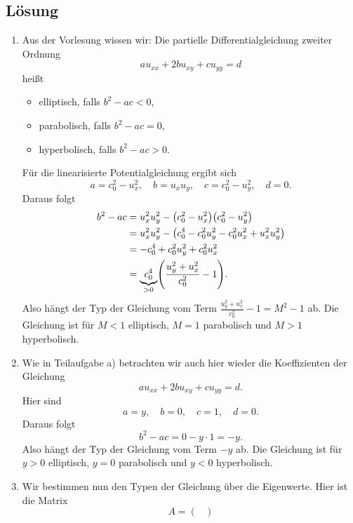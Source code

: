 \documentclass{exercise}
\begin{document}
    \subsection*{Lösung}
    \begin{enumerate}
        \item Aus der Vorlesung wissen wir: Die partielle Differentialgleichung zweiter Ordnung
        \[
            au_{xx} + 2bu_{xy} + cu_{yy} = d
        \]
        heißt
        \begin{itemize}
            \item elliptisch, falls \(b^2 - ac < 0\),
            \item parabolisch, falls \(b^2 - ac = 0\),
            \item hyperbolisch, falls \(b^2 - ac > 0\).
        \end{itemize}
        Für die linearisierte Potentialgleichung ergibt sich
        \[
            a = c_0^2 - u_x^2, \quad b = u_x u_y, \quad c = c_0^2 - u_y^2, \quad d = 0.
        \]
        Daraus folgt
        \begin{align*}
            b^2 - ac &= u_x^2 u_y^2 - \parentheses*{c_0^2 - u_x^2}\parentheses*{c_0^2 - u_y^2}\\
            &= u_x^2 u_y^2 - \parentheses*{c_0^4 - c_0^2 u_y^2 - c_0^2 u_x^2 + u_x^2 u_y^2}\\
            &= -c_0^4 + c_0^2 u_y^2 + c_0^2 u_x^2\\
            &= \underbrace{c_0^4}_{> 0}\parentheses*{\frac{u_y^2 + u_x^2}{c_0^2} - 1}.
        \end{align*}
        Also hängt der Typ der Gleichung vom Term \(\frac{u_y^2 + u_x^2}{c_0^2} - 1 = M^2 - 1\) ab.
        Die Gleichung ist für \(M < 1\) elliptisch, \(M = 1\) parabolisch und \(M > 1\) hyperbolisch.
        \item Wie in Teilaufgabe a) betrachten wir auch hier wieder die Koeffizienten der Gleichung
        \[
            au_{xx} + 2bu_{xy} + cu_{yy} = d.
        \]
        Hier sind
        \[
            a = y, \quad b = 0, \quad c = 1, \quad d = 0.
        \]
        Daraus folgt
        \[
            b^2 -ac = 0 - y \cdot 1 = -y.
        \]
        Also hängt der Typ der Gleichung vom Term \(-y\) ab.
        Die Gleichung ist für \(y > 0\) elliptisch, \(y = 0\) parabolisch und \(y < 0\) hyperbolisch.
        \item Wir bestimmen nun den Typen der Gleichung über die Eigenwerte.
        Hier ist die Matrix
        \[
            A = \begin{pmatrix}

\end{pmatrix}\]
\end{enumerate}
\end{document}
